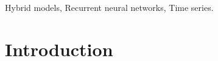 \documentclass[lettersize,journal]{IEEEtran}
\begin{document}
\begin{IEEEkeywords}
Hybrid models, Recurrent neural networks, Time series.
\end{IEEEkeywords}






%
\IEEEpeerreviewmaketitle


\section{Introduction}
\label{sec:introduction}
\end{document}
